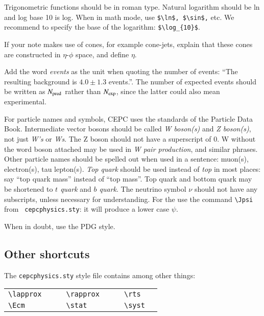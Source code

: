 \documentclass[11pt,a4paper]{cepcnote}
\begin{document}
Trigonometric functions should be in roman type. Natural logarithm
should be ln and log base 10 is log.  When in math mode, use
\verb+$\ln$, $\sin$,+ etc. We recommend to specify the base of the
logarithm: \verb+$\log_{10}$+.

If your note makes use of cones, for example cone-jets, explain that
these cones are constructed in $\eta$-$\phi$ space, and define $\eta$.

Add the word \emph{events} as the unit when quoting the number of
events: ``The resulting background is $4.0 \pm 1.3$ events.''.  The
number of expected events should be written as $N_{\rm pred}$ rather
than $N_{\rm exp}$, since the latter could also mean experimental.

For particle names and symbols, CEPC uses the standards of the
Particle Data Book. Intermediate vector bosons should be called
\emph{W boson(s)} and \emph{Z boson(s)}, not just \emph{W's} or
\emph{Ws}. The Z boson should not have a superscript of 0. W without
the word boson attached may be used in \emph{W pair production}, and
similar phrases.  Other particle names should be spelled out when used
in a sentence: muon(s), electron(s), tau lepton(s). \emph{Top quark}
should be used instead of \emph{top} in most places: say ``top quark
mass'' instead of ``top mass''.  Top quark and bottom quark may be
shortened to \emph{$t$ quark} and \emph{$b$ quark}. The neutrino
symbol $\nu$ should not have any subscripts, unless necessary for
understanding. For the \Jpsi{} use the command \verb+\Jpsi+ from {\tt
cepcphysics.sty}: it will produce a lower case $\psi$.

When in doubt, use the PDG style.

\subsection{Other shortcuts}

\noindent The {\tt cepcphysics.sty} style file contains among
other things:

\medskip

\begin{tabular}{llcllcll}
  \verb+\lapprox+ & \lapprox{} & \hspace{1cm} &
  \verb+\rapprox+ & \rapprox{}  &\hspace{1cm} &
  \verb+\rts+  & \rts{} \\
  \verb+\Ecm+ & \Ecm{} & &
  \verb+\stat+ & \stat{} & &
  \verb+\syst+ & \syst{} \\
\end{tabular}
\end{document}
